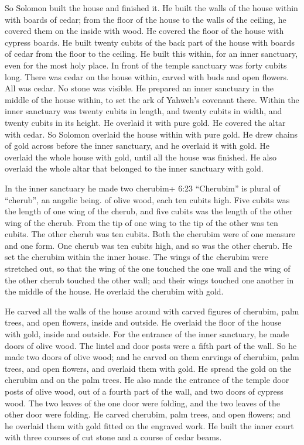  So Solomon built the house and finished it. 
He built the walls of the house within with boards of cedar; from the
floor of the house to the walls of the ceiling, he covered them on the
inside with wood. He covered the floor of the house with cypress boards.
 He built twenty cubits of the back part of the house with
boards of cedar from the floor to the ceiling. He built this within, for
an inner sanctuary, even for the most holy place.  In front
of the temple sanctuary was forty cubits long.  There was
cedar on the house within, carved with buds and open flowers. All was
cedar. No stone was visible.  He prepared an inner
sanctuary in the middle of the house within, to set the ark of Yahweh's
covenant there.  Within the inner sanctuary was twenty
cubits in length, and twenty cubits in width, and twenty cubits in its
height. He overlaid it with pure gold. He covered the altar with cedar.
 So Solomon overlaid the house within with pure gold. He
drew chains of gold across before the inner sanctuary, and he overlaid
it with gold.  He overlaid the whole house with gold, until
all the house was finished. He also overlaid the whole altar that
belonged to the inner sanctuary with gold.

 In the inner sanctuary he made two cherubim+ 6:23
``Cherubim'' is plural of ``cherub'', an angelic being. of olive wood,
each ten cubits high.  Five cubits was the length of one
wing of the cherub, and five cubits was the length of the other wing of
the cherub. From the tip of one wing to the tip of the other was ten
cubits.  The other cherub was ten cubits. Both the cherubim
were of one measure and one form.  One cherub was ten
cubits high, and so was the other cherub.  He set the
cherubim within the inner house. The wings of the cherubim were
stretched out, so that the wing of the one touched the one wall and the
wing of the other cherub touched the other wall; and their wings touched
one another in the middle of the house.  He overlaid the
cherubim with gold.

 He carved all the walls of the house around with carved
figures of cherubim, palm trees, and open flowers, inside and outside.
 He overlaid the floor of the house with gold, inside and
outside.  For the entrance of the inner sanctuary, he made
doors of olive wood. The lintel and door posts were a fifth part of the
wall.  So he made two doors of olive wood; and he carved on
them carvings of cherubim, palm trees, and open flowers, and overlaid
them with gold. He spread the gold on the cherubim and on the palm
trees.  He also made the entrance of the temple door posts
of olive wood, out of a fourth part of the wall,  and two
doors of cypress wood. The two leaves of the one door were folding, and
the two leaves of the other door were folding.  He carved
cherubim, palm trees, and open flowers; and he overlaid them with gold
fitted on the engraved work.  He built the inner court with
three courses of cut stone and a course of cedar beams.

